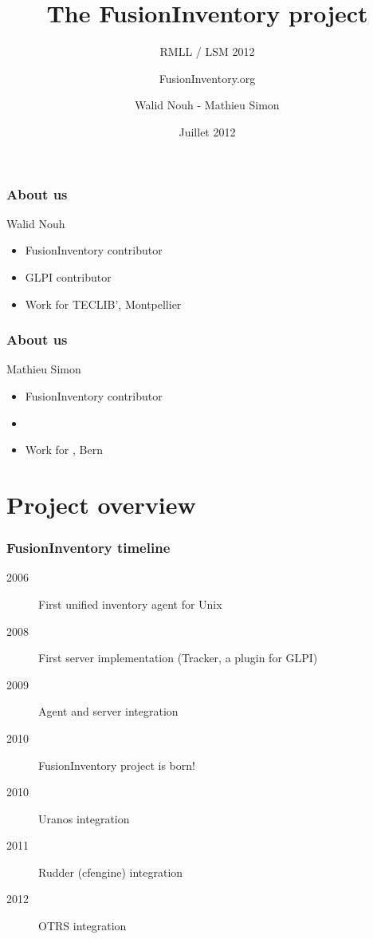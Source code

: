 \documentclass{beamer}
\title{The FusionInventory project}
\author{{FusionInventory.org}}
\date{Juillet 2012}
\institute{\texttt{[image: ./pics/rmll2011.jpg]}}
\subtitle{RMLL / LSM 2012}
\institute{Genève}
\author{ Walid Nouh - Mathieu Simon}
\begin{document}
\frame[plain]{\titlepage}


\begin{frame}
    \frametitle{About us}


    \begin{block}{Walid Nouh}
        \begin{itemize}
        \item FusionInventory contributor
        \item GLPI contributor  
        \item Work for TECLIB', Montpellier
        \end{itemize}
    \end{block}

\end{frame}

\begin{frame}
    \frametitle{About us}


    \begin{block}{Mathieu Simon}
        \begin{itemize}
        \item FusionInventory contributor
        \item 
        \item Work for , Bern
        \end{itemize}
    \end{block}

\end{frame}

\section{Project overview}

\begin{frame}
    \frametitle{FusionInventory timeline}

    \begin{description}
      \item[2006] First unified inventory agent for Unix
      \item[2008] First server implementation (Tracker, a plugin for GLPI)
      \item[2009] Agent and server integration
      \item[2010] FusionInventory project is born! 
      \item[2010] Uranos integration
      \item[2011] Rudder (cfengine) integration
      \item[2012] OTRS integration
    \end{description}

\end{frame}
\end{document}
